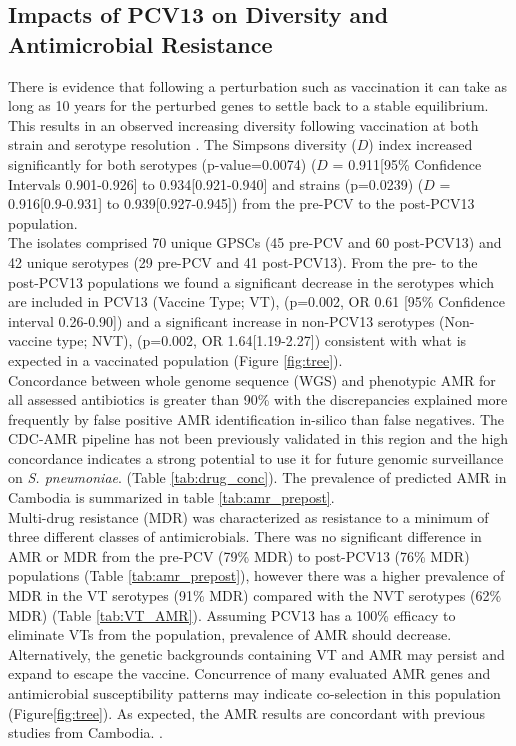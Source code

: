 \documentclass{article}
\begin{document}
\subsection{Impacts of PCV13 on Diversity and Antimicrobial Resistance}
There is evidence that following a perturbation such as vaccination it can take as long as 10 years for the perturbed genes to settle back to a stable equilibrium. This results in an observed increasing diversity following vaccination at both strain and serotype resolution \cite{hanageEvidenceThatPneumococcal2010,lepolaindewarouxPredictingImpactPneumococcal2018}. The Simpsons diversity ($D$) index increased significantly for both serotypes (p-value=0.0074) ($D$ = 0.911[95\% Confidence Intervals 0.901-0.926] to 0.934[0.921-0.940] and strains (p=0.0239) ($D$ = 0.916[0.9-0.931] to 0.939[0.927-0.945]) from the pre-PCV to the post-PCV13 population. 
\\The isolates comprised 70 unique GPSCs (45 pre-PCV and 60 post-PCV13) and 42 unique serotypes (29 pre-PCV and 41 post-PCV13). From the pre- to the post-PCV13 populations we found a significant decrease in the serotypes which are included in PCV13 (Vaccine Type; VT), (p=0.002, OR 0.61 [95\% Confidence interval 0.26-0.90]) and a significant increase in non-PCV13 serotypes (Non-vaccine type; NVT), (p=0.002, OR 1.64[1.19-2.27]) consistent with what is expected in a vaccinated population \cite{rodrigoImpactInfant13valent2015,turnerImpact13ValentPneumococcal2020,loPneumococcalLineagesAssociated2019,lepolaindewarouxPredictingImpactPneumococcal2018} (Figure \ref{fig:tree}). \\ Concordance between whole genome sequence (WGS) and phenotypic AMR for all assessed antibiotics is greater than 90\% with the discrepancies explained more frequently by false positive AMR identification in-silico than false negatives. The CDC-AMR pipeline has not been previously validated in this region and the high concordance indicates a strong potential to use it for future genomic surveillance on \textit{S. pneumoniae}. (Table \ref{tab:drug_conc}). The prevalence of predicted AMR in Cambodia is summarized in table \ref{tab:amr_prepost}.
\\Multi-drug resistance (MDR) was characterized as resistance to a minimum of three different classes of antimicrobials. There was no significant difference in AMR or MDR from the pre-PCV (79\% MDR) to post-PCV13 (76\% MDR) populations (Table \ref{tab:amr_prepost}), however there was a higher prevalence of MDR in the VT serotypes (91\% MDR) compared with the NVT serotypes (62\% MDR) (Table \ref{tab:VT_AMR}). Assuming PCV13 has a 100\% efficacy to eliminate VTs from the population, prevalence of AMR should decrease. Alternatively, the genetic backgrounds containing VT and AMR may persist and expand to escape the vaccine. Concurrence of many evaluated AMR genes and antimicrobial susceptibility patterns may indicate co-selection in this population (Figure\ref{fig:tree}). As expected, the AMR results are concordant with previous studies from Cambodia. \cite{turnerPneumococcalInfectionChildren2015}. 
\end{document}
